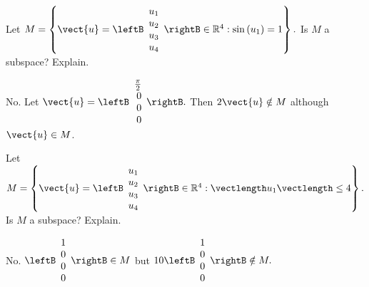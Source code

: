\begin{enumialphparenastyle}
\begin{ex} Let $M=\left\{ \vect{u}=\leftB 
\begin{array}{c}
u_{1} \\
u_{2} \\
u_{3} \\
u_{4}
\end{array}
\rightB \in 
\mathbb{R}^{4}:\sin \left( u_{1}\right) =1\right\} .$ Is $M$ a subspace?
Explain.
\begin{sol}
No. Let $\vect{u}=\leftB \begin{array}{r}
\frac{\pi }{2} \\
0 \\
0 \\
0
\end{array}
\rightB .$ Then $2\vect{u}\notin M$ although $\vect{u}\in M$.
\end{sol}
\end{ex}

\begin{ex} Let $M=\left\{ \vect{u}=\leftB \begin{array}{c}
u_{1} \\
u_{2} \\
u_{3} \\
u_{4}
\end{array}\rightB \in 
\mathbb{R}^{4}:\vectlength u_{1}\vectlength \leq 4\right\} .$ Is $M$ a
subspace? Explain.
\begin{sol}
No. $\leftB
\begin{array}{r}
1 \\
0 \\
0 \\
0
\end{array}
\rightB \in M$ but $10\leftB \begin{array}{r}
1 \\
0 \\
0 \\
0
\end{array}
\rightB \notin M.$
\end{sol}
\end{ex}


\end{enumialphparenastyle}
